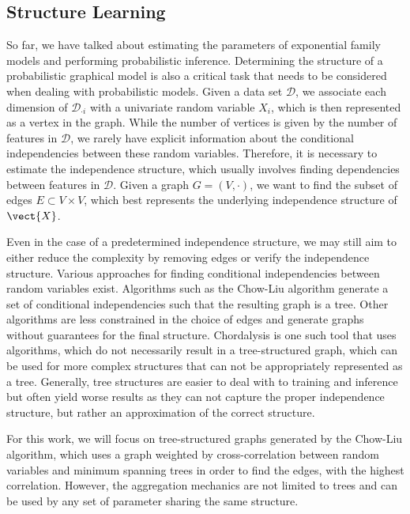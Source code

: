 \subsection{Structure Learning}

So far, we have talked about estimating the parameters of exponential family models and performing probabilistic inference.
Determining the structure of a probabilistic graphical model is also a critical task that needs to be considered when dealing with probabilistic models.
Given a data set $\mathcal{D}$, we associate each dimension of $\mathcal{D}_{\cdot i}$ with a univariate random variable $X_i$, which is then represented as a vertex in the graph.
While the number of vertices is given by the number of features in $\mathcal{D}$, we rarely have explicit information about the conditional independencies between these random variables. 
Therefore, it is necessary to estimate the independence structure, which usually involves finding dependencies between features in $\mathcal{D}$. 
Given a graph $G=(V, \cdot)$, we want to find the subset of edges $E \subset V \times V$, which best represents the underlying independence structure of $\vect{X}$.

Even in the case of a predetermined independence structure, we may still aim to either reduce the complexity by removing edges or verify the independence structure.
Various approaches for finding conditional independencies between random variables exist.
Algorithms such as the Chow-Liu algorithm generate a set of conditional independencies such that the resulting graph is a tree.
Other algorithms are less constrained in the choice of edges and generate graphs without guarantees for the final structure.
Chordalysis is one such tool that uses algorithms, which do not necessarily result in a tree-structured graph, which can be used for more complex structures that can not be appropriately represented as a tree. 
Generally, tree structures are easier to deal with \wrt to training and inference but often yield worse results as they can not capture the proper independence structure, but rather an approximation of the correct structure.

For this work, we will focus on tree-structured graphs generated by the Chow-Liu algorithm, which uses a graph weighted by cross-correlation between random variables and minimum spanning trees in order to find the edges, with the highest correlation.
However, the aggregation mechanics are not limited to trees and can be used by any set of parameter sharing the same structure.

